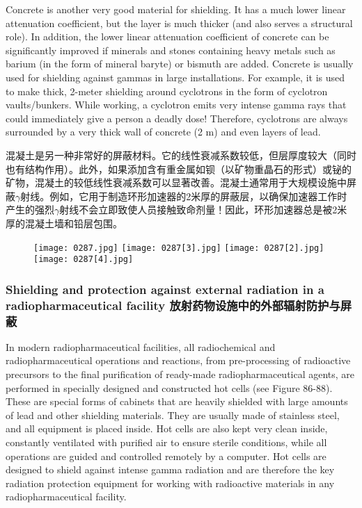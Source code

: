 \documentclass[dvipsnames, svgnames,a4paper,11pt]{article}
\begin{document}
Concrete is another very good material for shielding. It has a much lower linear attenuation coefficient, but the layer is much thicker (and also serves a structural role). In addition, the lower linear attenuation coefficient of concrete can be significantly improved if minerals and stones containing heavy metals such as barium (in the form of mineral baryte) or bismuth are added. Concrete is usually used for shielding against gammas in large installations. For example, it is used to make thick, 2-meter shielding around cyclotrons in the form of cyclotron vaults/bunkers. While working, a cyclotron emits very intense gamma rays that could immediately give a person a deadly dose! Therefore, cyclotrons are always surrounded by a very thick wall of concrete (2 m) and even layers of lead.

混凝土是另一种非常好的屏蔽材料。它的线性衰减系数较低，但层厚度较大（同时也有结构作用）。此外，如果添加含有重金属如钡（以矿物重晶石的形式）或铋的矿物，混凝土的较低线性衰减系数可以显著改善。混凝土通常用于大规模设施中屏蔽$\gamma$射线。例如，它用于制造环形加速器的2米厚的屏蔽层，以确保加速器工作时产生的强烈$\gamma$射线不会立即致使人员接触致命剂量！因此，环形加速器总是被2米厚的混凝土墙和铅层包围。

\begin{figure}[h]
    \centering
    \texttt{[image: 0287.jpg]} \hspace{0.2in}
    \texttt{[image: 0287[3].jpg]}  \hspace{0.2in}
    \texttt{[image: 0287[2].jpg]} \hspace{0.2in}
    \texttt{[image: 0287[4].jpg]}  
     \label{fig381}
\end{figure}


\subsubsection{Shielding and protection against external radiation in a radiopharmaceutical facility 放射药物设施中的外部辐射防护与屏蔽}

In modern radiopharmaceutical facilities, all radiochemical and radiopharmaceutical operations and reactions, from pre-processing of radioactive precursors to the final purification of ready-made radiopharmaceutical agents, are performed in specially designed and constructed hot cells (see Figure 86-88). These are special forms of cabinets that are heavily shielded with large amounts of lead and other shielding materials. They are usually made of stainless steel, and all equipment is placed inside. Hot cells are also kept very clean inside, constantly ventilated with purified air to ensure sterile conditions, while all operations are guided and controlled remotely by a computer. Hot cells are designed to shield against intense gamma radiation and are therefore the key radiation protection equipment for working with radioactive materials in any radiopharmaceutical facility.
\end{document}
